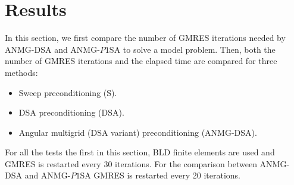 \section{Results}
In this section, we first compare the number of GMRES iterations needed by
ANMG-DSA and ANMG-$P1$SA to solve a model problem. Then, both the number of
GMRES iterations and the elapsed time are compared for three methods:
\begin{itemize}
  \item Sweep preconditioning (S).
  \item DSA preconditioning (DSA).
  \item Angular multigrid (DSA variant) preconditioning (ANMG-DSA).
\end{itemize}
For all the tests the first in this section, BLD finite elements are used and GMRES is
restarted every 30 iterations. For the comparison between ANMG-DSA and
ANMG-$P1$SA GMRES is restarted every 20 iterations.
